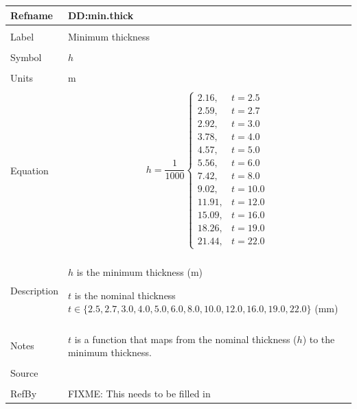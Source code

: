 \documentclass[12pt]{article}
\begin{document}
\noindent \begin{minipage}{\textwidth}
\begin{tabular}{p{} p{}}
\toprule \textbf{Refname} & \textbf{DD:min.thick}
\label{DD:min.thick}
\\ \midrule \\
Label & Minimum thickness
\\ \midrule \\
Symbol & $h$
\\ \midrule \\
Units & m
\\ \midrule \\
Equation & \begin{dmath}
           h=\frac{1}{1000} \begin{cases}
2.16, & t=2.5\\
2.59, & t=2.7\\
2.92, & t=3.0\\
3.78, & t=4.0\\
4.57, & t=5.0\\
5.56, & t=6.0\\
7.42, & t=8.0\\
9.02, & t=10.0\\
11.91, & t=12.0\\
15.09, & t=16.0\\
18.26, & t=19.0\\
21.44, & t=22.0
\end{cases}
           \end{dmath}
\\ \midrule \\
Description & \begin{symbDescription}
              \item{$h$ is the minimum thickness (m)}
              \item{$t$ is the nominal thickness $t\in{}\{2.5,2.7,3.0,4.0,5.0,6.0,8.0,10.0,12.0,16.0,19.0,22.0\}$ (mm)}
              \end{symbDescription}
\\ \midrule \\
Notes & $t$ is a function that maps from the nominal thickness ($h$) to the minimum thickness.
\\ \midrule \\
Source & \cite{astm2009}
\\ \midrule \\
RefBy & FIXME: This needs to be filled in
\\ \bottomrule \end{tabular}
\end{minipage}\\
\end{document}
